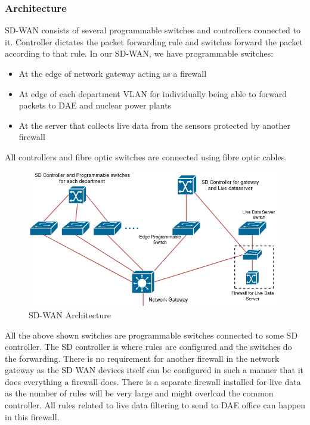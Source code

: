 \documentclass{article}
\begin{document}
\subsubsection{Architecture}
SD-WAN consists of several programmable switches and controllers connected to it. Controller dictates the packet forwarding rule and switches forward the packet according to that rule. In our SD-WAN, we have programmable switches:
\begin{itemize}
	\item At the edge of network gateway acting as a firewall
	\item At edge of each department VLAN for individually being able to forward packets to DAE and nuclear power plants
	\item At the server that collects live data from the sensors protected by another firewall
\end{itemize}
All controllers and fibre optic switches are connected using fibre optic cables.
\begin{figure}[htb]
	\centering
	\includegraphics[width=12cm,height=6cm]{sdwan.png}
	\caption{SD-WAN Architecture}
\end{figure}
All the above shown switches are programmable switches connected to some SD controller. The SD controller is where rules are configured and the switches do the forwarding. There is no requirement for another firewall in the network gateway as the SD WAN devices itself can be configured in such a manner that it does everything a firewall does. There is a separate firewall installed for live data as the number of rules will be very large and might overload the common controller. All rules related to live data filtering to send to DAE office can happen in this firewall.
\end{document}
